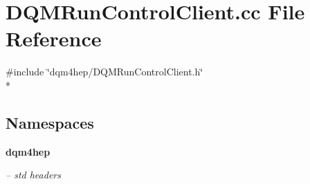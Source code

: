 \section{D\+Q\+M\+Run\+Control\+Client.\+cc File Reference}
\label{DQMRunControlClient_8cc}
{\ttfamily \#include \char`\"{}dqm4hep/\+D\+Q\+M\+Run\+Control\+Client.\+h\char`\"{}}\\*
\subsection*{Namespaces}
\begin{DoxyCompactItemize}
\item 
 {\bf dqm4hep}
\begin{DoxyCompactList}\small\item\em -- std headers \end{DoxyCompactList}\end{DoxyCompactItemize}

